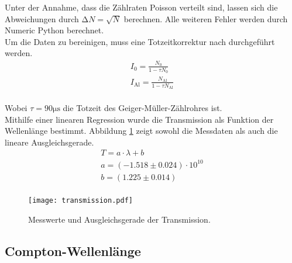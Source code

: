 \noindent Unter der Annahme, dass die Zählraten Poisson verteilt sind,
lassen sich die Abweichungen durch $\increment N = \sqrt{N}$ berechnen.
Alle weiteren Fehler werden durch Numeric Python berechnet.\\
Um die Daten zu bereinigen, muss eine Totzeitkorrektur nach %
durchgeführt werden. 
\begin{align*}
    I_0 = \frac{N_0}{1 - \tau N_0}\\
    I_\text{Al} = \frac{N_\text{Al}}{1 - \tau N_\text{Al}}\\
\end{align*}

Wobei $\tau = 90 \si{\micro\s}$ die Totzeit des Geiger-Müller-Zählrohres 
ist.\\
Mithilfe einer linearen Regression wurde die Transmission als Funktion 
der Wellenlänge bestimmt. Abbildung \ref{fig:transmission} zeigt sowohl
die Messdaten als auch die lineare Ausgleichsgerade.
\begin{align*}
    T = a \cdot \lambda + b \\
    a = \left( - 1.518 \pm 0.024 \right) \cdot 10^{10} \\
    b = \left( 1.225 \pm 0.014 \right)\\
\end{align*}

\begin{figure}
    \centering
    \texttt{[image: transmission.pdf]}
    \caption{Messwerte und Ausgleichsgerade der Transmission.}
    \label{fig:transmission}
\end{figure}

\subsection{Compton-Wellenlänge}

